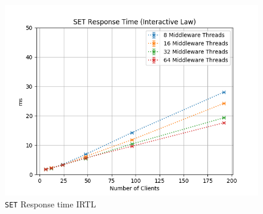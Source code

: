 \documentclass[11pt,a4paper]{article}
\begin{document}
%
\begin{figure}[H]
	\centering
    \begin{minipage}{0.5\textwidth}
        \includegraphics[width=\textwidth]{../illustrations/plots/2_1_one_middleware/1-0/middleware_interactive_set_rt_ms.png}
        \caption{\texttt{SET} Response time IRTL}
        \label{fig:one_middleware_set_rt_it}
    \end{minipage}\hfill
\end{figure}
%
\end{document}
